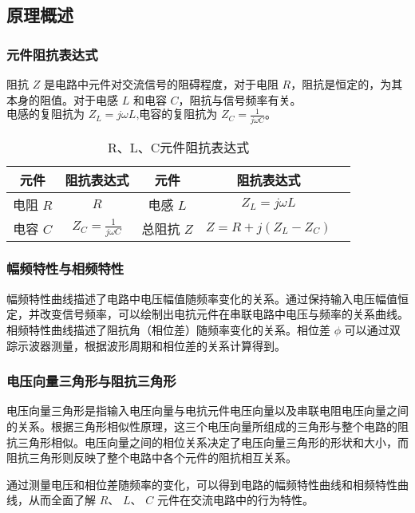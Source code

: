 \documentclass[dvipsnames, svgnames,a4paper,11pt]{article}
\begin{document}
	
	\subsection{原理概述}
	\subsubsection{元件阻抗表达式}
阻抗 \( Z \) 是电路中元件对交流信号的阻碍程度，对于电阻 \( R \)，阻抗是恒定的，为其本身的阻值。对于电感 \( L \) 和电容 \( C \)，阻抗与信号频率有关。$\text{电感的复阻抗为 }Z_L=j\omega L\text{,电容的复阻抗为 }Z_C=\frac1{j\omega C}。$
\begin{table}[htbp]
	\centering
	\caption{R、L、C元件阻抗表达式}
	\begin{tabular}{|c|c|c|c|c|}
		\hline
	  元件 & 阻抗表达式 & 元件 & 阻抗表达式 \\ 
	  \hline
	  电阻 \( R \) & \( R \) & 电感 \( L \) & $Z_{L}=j\omega L$ \\
	  \hline
	  电容 \( C \) & $Z_C=\frac{1}{j\omega C}$ & 总阻抗 \( Z \) & \( Z = R + j(Z_L - Z_C) \) \\ 
	  \hline
	\end{tabular}
  \end{table}
\subsubsection{幅频特性与相频特性}
幅频特性曲线描述了电路中电压幅值随频率变化的关系。通过保持输入电压幅值恒定，并改变信号频率，可以绘制出电抗元件在串联电路中电压与频率的关系曲线。相频特性曲线描述了阻抗角（相位差）随频率变化的关系。相位差 \( \phi \) 可以通过双踪示波器测量，根据波形周期和相位差的关系计算得到。

\subsubsection{电压向量三角形与阻抗三角形}
电压向量三角形是指输入电压向量与电抗元件电压向量以及串联电阻电压向量之间的关系。根据三角形相似性原理，这三个电压向量所组成的三角形与整个电路的阻抗三角形相似。电压向量之间的相位关系决定了电压向量三角形的形状和大小，而阻抗三角形则反映了整个电路中各个元件的阻抗相互关系。

通过测量电压和相位差随频率的变化，可以得到电路的幅频特性曲线和相频特性曲线，从而全面了解 \( R \)、 \( L \)、 \( C \) 元件在交流电路中的行为特性。

	
	
	
\end{document}

